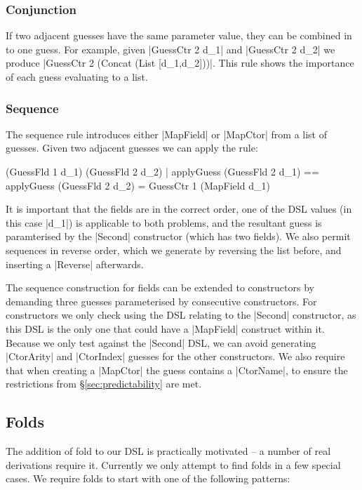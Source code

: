 \documentclass[preprint,draft]{sigplanconf}
\begin{document}
\subsubsection{Conjunction}

If two adjacent guesses have the same parameter value, they can be combined in to one guess. For example, given |GuessCtr 2 d_1| and |GuessCtr 2 d_2| we produce |GuessCtr 2 (Concat (List [d_1,d_2]))|. This rule shows the importance of each guess evaluating to a list.

\subsubsection{Sequence}
\label{sec:guess_lists_sequence}

The sequence rule introduces either |MapField| or |MapCtor| from a list of guesses. Given two adjacent guesses we can apply the rule:

\ignore\begin{code}
(GuessFld 1 d_1) (GuessFld 2 d_2)
    | applyGuess (GuessFld 2 d_1) == applyGuess (GuessFld 2 d_2)
    = GuessCtr 1 (MapField d_1)
\end{code}

It is important that the fields are in the correct order, one of the DSL values (in this case |d_1|) is applicable to both problems, and the resultant guess is paramterised by the |Second| constructor (which has two fields). We also permit sequences in reverse order, which we generate by reversing the list before, and inserting a |Reverse| afterwards.

The sequence construction for fields can be extended to constructors by demanding three guesses parameterised by consecutive constructors. For constructors we only check using the DSL relating to the |Second| constructor, as this DSL is the only one that could have a |MapField| construct within it. Because we only test against the |Second| DSL, we can avoid generating |CtorArity| and |CtorIndex| guesses for the other constructors. We also require that when creating a |MapCtor| the guess contains a |CtorName|, to ensure the restrictions from \S\ref{sec:predictability} are met.

\subsection{Folds}

The addition of fold to our DSL is practically motivated -- a number of real derivations require it. Currently we only attempt to find folds in a few special cases. We require folds to start with one of the following patterns:
\end{document}
